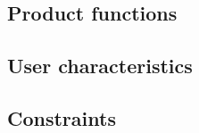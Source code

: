 \documentclass{article}
\begin{document}
\subsection{Product functions}



\subsection{User characteristics}


\subsection{Constraints}
\end{document}

